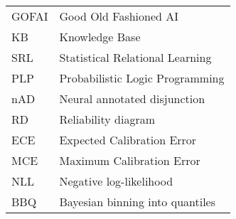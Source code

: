 \begin{flushleft}
\renewcommand{\arraystretch}{1.1}
\begin{tabularx}{\textwidth}{@{}p{12mm}X@{}}
GOFAI & Good Old Fashioned AI \\
KB & Knowledge Base \\
SRL & Statistical Relational Learning \\
PLP & Probabilistic Logic Programming \\
nAD & Neural annotated disjunction \\
RD & Reliability diagram \\
ECE & Expected Calibration Error \\
MCE & Maximum Calibration Error \\
NLL & Negative log-likelihood \\
BBQ & Bayesian binning into quantiles
\end{tabularx}
\end{flushleft}